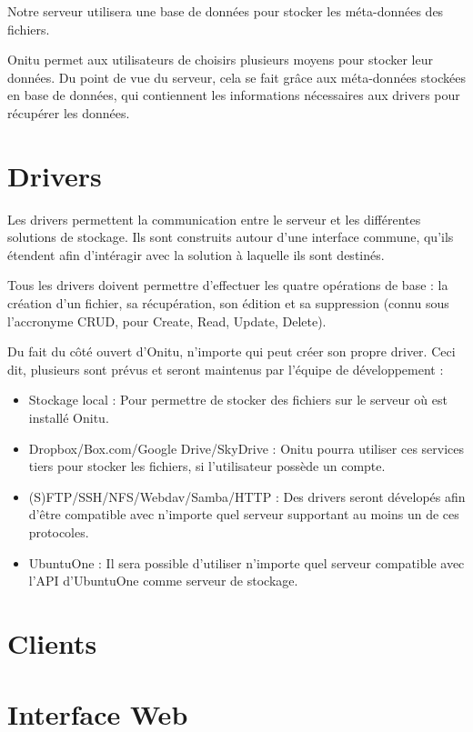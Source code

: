 Notre serveur utilisera une base de données pour stocker les méta-données des fichiers.

Onitu permet aux utilisateurs de choisirs plusieurs moyens pour stocker leur données. Du point de vue du serveur, cela se fait grâce aux méta-données stockées en base de données, qui contiennent les informations nécessaires aux drivers pour récupérer les données. 

\section{Drivers}
Les drivers permettent la communication entre le serveur et les différentes solutions de stockage. Ils sont construits autour d'une interface commune, qu'ils étendent afin d'intéragir avec la solution à laquelle ils sont destinés.

Tous les drivers doivent permettre d'effectuer les quatre opérations de base : la création d'un fichier, sa récupération, son édition et sa suppression (connu sous l'accronyme CRUD, pour Create, Read, Update, Delete).

Du fait du côté ouvert d'Onitu, n'importe qui peut créer son propre driver. Ceci dit, plusieurs sont prévus et seront maintenus par l'équipe de développement :
\begin{itemize}
    \item Stockage local : Pour permettre de stocker des fichiers sur le serveur où est installé Onitu.
    \item Dropbox/Box.com/Google Drive/SkyDrive : Onitu pourra utiliser ces services tiers pour stocker les fichiers, si l'utilisateur possède un compte.
    \item (S)FTP/SSH/NFS/Webdav/Samba/HTTP : Des drivers seront dévelopés afin d'être compatible avec n'importe quel serveur supportant au moins un de ces protocoles.
    \item UbuntuOne : Il sera possible d'utiliser n'importe quel serveur compatible avec l'API d'UbuntuOne comme serveur de stockage.
\end{itemize}

\section{Clients}

\section{Interface Web}
